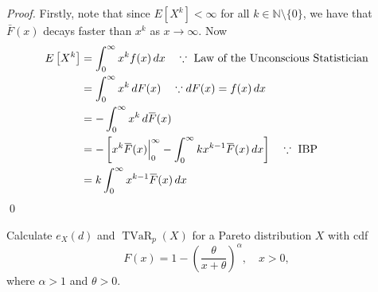 \documentclass[notoc,notitlepage]{tufte-book}
\DeclareMathOperator{\TVaR}{TVaR}
\begin{document}
\begin{proof}
  Firstly, note that since $E[X^k] < \infty$ for all $k \in \mathbb{N} \setminus \{0\}$, we have that $\bar{F}(x)$ decays faster than $x^k$ as $x \to \infty$. Now
  \begin{align*}
    E\left[ X^k \right] &= \int_{0}^{\infty} x^k f(x) \dif{x} \quad \because \text{ Law of the Unconscious Statistician} \\
                        &= \int_{0}^{\infty} x^k \dif{F(x)} \quad \because \dif{F(x)} = f(x) \dif{x} \\
                        &= - \int_{0}^{\infty} x^k \dif{\bar{F}(x)} \\
                        &= - \left[ x^k \bar{F}(x) \at{0}{\infty} - \int_{0}^{\infty} kx^{k - 1} \bar{F}(x) \dif{x} \right] \quad \because \text{ IBP } \\
                        &= k \int_{0}^{\infty} x^{k - 1} \bar{F}(x) \dif{x}
  \end{align*} \qed
\end{proof}

\begin{eg}
  Calculate $e_X(d)$ and $\TVaR_p(X)$ for a Pareto distribution $X$ with cdf
  \begin{equation*}
    F(x) = 1 - \left( \frac{\theta}{x + \theta} \right)^\alpha, \quad x > 0,
  \end{equation*}
  where $\alpha > 1$ and $\theta > 0$.
\end{eg}
\end{document}
